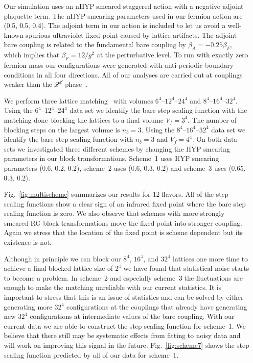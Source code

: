 \documentclass{PoS}
\newcommand{\Sb}{\ensuremath{\cancel{S^4}} }
\newcommand{\fig}[1]{Fig.~\ref{#1}}
\newcommand{\TODO}[1]{\textcolor{red}{{\bf #1}}}
\begin{document}
Our simulation uses an nHYP smeared staggered action with a negative adjoint plaquette term.
The nHYP smearing parameters used in our fermion action are (0.5, 0.5, 0.4).
The adjoint term in our action is included to let us avoid a well-known spurious ultraviolet fixed point caused by lattice artifacts.
The adjoint bare coupling is related to the fundamental bare coupling by $\beta_A = -0.25\beta_F$, which implies that $\beta_F = 12 / g^2$ at the perturbative level.
To run with exactly zero fermion mass our configurations were generated with anti-periodic boundary conditions in all four directions.
All of our analyses are carried out at couplings weaker than the \Sb phase~\TODO{\cite{}}.

We perform three lattice matching~\TODO{\cite{}} with volumes $6^4$--$12^4$--$24^4$ and $8^4$--$16^4$--$32^4$.
Using the $6^4$--$12^4$--$24^4$ data set we identify the bare step scaling function with the matching done blocking the lattices to a final volume $V_f = 3^4$.
The number of blocking steps on the largest volume is $n_b = 3$.
Using the $8^4$--$16^4$--$32^4$ data set we identify the bare step scaling function with $n_b = 3$ and $V_f = 4^4$.
On both data sets we investigated three different schemes by changing the HYP smearing parameters in our block transformations.
Scheme~1 uses HYP smearing parameters (0.6, 0.2, 0.2), scheme~2 uses (0.6, 0.3, 0.2) and scheme~3 uses (0.65, 0.3, 0.2).

\fig{fig:multischeme} summarizes our results for 12 flavors.
All of the step scaling functions show a clear sign of an infrared fixed point where the bare step scaling function is zero.
We also observe that schemes with more strongly smeared RG block transformations move the fixed point into stronger coupling.
Again we stress that the location of the fixed point is scheme dependent but its existence is not.

Although in principle we can block our $8^4$, $16^4$, and $32^4$ lattices one more time to achieve a final blocked lattice size of $2^4$ we have found that statistical noise starts to become a problem.
In scheme~2 and especially scheme~3 the fluctuations are enough to make the matching unreliable with our current statistics.
It is important to stress that this is an issue of statistics and can be solved by either generating more $32^4$ configurations at the couplings that already have generating new $32^4$ configurations at intermediate values of the bare coupling.
With our current data we are able to construct the step scaling function for scheme~1.
We believe that there still may be systematic effects from fitting to noisy data and will work on improving this signal in the future.
\fig{fig:scheme7} shows the step scaling function predicted by all of our data for scheme~1.
\end{document}
